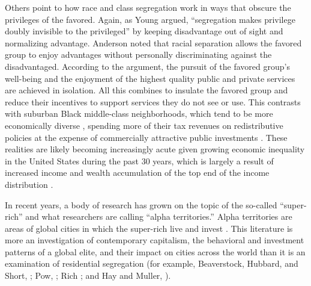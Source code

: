 \documentclass[11pt,]{article}
\begin{document}
Others point to how race and class segregation work in ways that obscure
the privileges of the favored. Again, as Young
\autocite*[p.208]{young2002} argued, ``segregation makes privilege
doubly invisible to the privileged'' by keeping disadvantage out of
sight and normalizing advantage. Anderson \autocite*{anderson2010} noted
that racial separation allows the favored group to enjoy advantages
without personally discriminating against the disadvantaged. According
to the argument, the pursuit of the favored group's well-being and the
enjoyment of the highest quality public and private services are
achieved in isolation. All this combines to insulate the favored group
and reduce their incentives to support services they do not see or use.
This contrasts with suburban Black middle-class neighborhoods, which
tend to be more economically diverse \autocite{pattillo2005black},
spending more of their tax revenues on redistributive policies at the
expense of commercially attractive public investments
\autocite{phelan1996race,anderson2010}. These realities are likely
becoming increasingly acute given growing economic inequality in the
United States during the past 30 years, which is largely a result of
increased income and wealth accumulation of the top end of the income
distribution \autocite{saez2013,shapiro2017}.

In recent years, a body of research has grown on the topic of the
so-called ``super-rich'' and what researchers are calling ``alpha
territories.'' Alpha territories are areas of global cities in which the
super-rich live and invest
\autocite{atkinson2017,burrows2014life,forrest2017}. This literature is
more an investigation of contemporary capitalism, the behavioral and
investment patterns of a global elite, and their impact on cities across
the world than it is an examination of residential segregation (for
example, Beaverstock, Hubbard, and Short, \autocite*{beaverstock2004};
Pow, \autocite*{pow2011living}; Rich \autocite*{rich2008}; and Hay and
Muller, \autocite*{hay2012tiny}).
\end{document}
